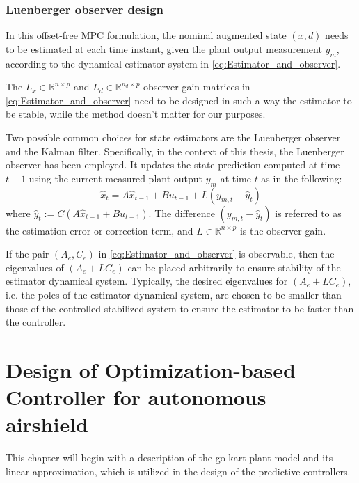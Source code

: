 \documentclass[a4paper,12pt,oneside]{book}
\begin{document}
\subsection*{Luenberger observer design}

In this offset-free MPC formulation, the nominal augmented state $(x,d)$ needs to be estimated at each time instant, given the plant output measurement $y_m$, according to the dynamical estimator system in \eqref{eq:Estimator_and_observer}.

The $L_x \in \mathbb{R}^{n \times p}$ and $L_d \in \mathbb{R}^{n_d \times p} $ observer gain matrices in \eqref{eq:Estimator_and_observer} need to be designed in such a way the estimator to be stable, while the method doesn't matter for our purposes.

\bigskip
Two possible common choices for state estimators are the Luenberger observer and the Kalman filter. 
Specifically, in the context of this thesis, the Luenberger observer has been employed.
It updates the state prediction computed at time $t-1$ using the current measured plant output $y_m$ at time $t$ as in the following:
\begin{equation}
    \hat{x}_t = A \hat{x}_{t-1} + B u_{t-1} + L (y_{m,t} - \hat{y}_t)
\end{equation}
where $\hat{y}_t := C(A \hat{x}_{t-1} + B u_{t-1})$.
The difference $(y_{m,t} - \hat{y}_t)$ is referred to as the estimation error or correction term, and $L \in \mathbb{R}^{n \times p}$ is the observer gain.

\bigskip
If the pair $(A_e,C_e)$ in \eqref{eq:Estimator_and_observer} is observable, then the eigenvalues of $(A_e+LC_e)$ can be placed arbitrarily to ensure stability of the estimator dynamical system.
Typically, the desired eigenvalues for $(A_e+LC_e)$, i.e. the poles of the estimator dynamical system, are chosen to be smaller than those of the controlled stabilized system to ensure the estimator to be faster than the controller.

\chapter{Design of Optimization-based Controller for autonomous airshield}
\label{chapter:Control_design}
This chapter will begin with a description of the go-kart plant model and its linear approximation, which is utilized in the design of the predictive controllers. 
\end{document}

